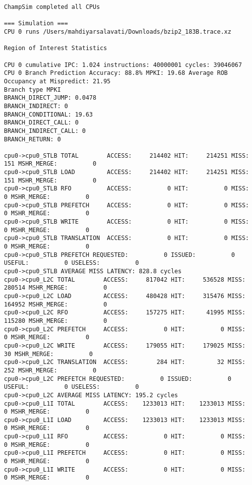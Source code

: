 \documentclass[17pt]{article}
\begin{document}
\begin{LTR}
\begin{lstlisting}[basicstyle=\tiny\ttfamily]
ChampSim completed all CPUs

=== Simulation ===
CPU 0 runs /Users/mahdiyarsalavati/Downloads/bzip2_183B.trace.xz

Region of Interest Statistics

CPU 0 cumulative IPC: 1.024 instructions: 40000001 cycles: 39046067
CPU 0 Branch Prediction Accuracy: 88.8% MPKI: 19.68 Average ROB Occupancy at Mispredict: 21.95
Branch type MPKI
BRANCH_DIRECT_JUMP: 0.0478
BRANCH_INDIRECT: 0
BRANCH_CONDITIONAL: 19.63
BRANCH_DIRECT_CALL: 0
BRANCH_INDIRECT_CALL: 0
BRANCH_RETURN: 0

cpu0->cpu0_STLB TOTAL        ACCESS:     214402 HIT:     214251 MISS:        151 MSHR_MERGE:          0
cpu0->cpu0_STLB LOAD         ACCESS:     214402 HIT:     214251 MISS:        151 MSHR_MERGE:          0
cpu0->cpu0_STLB RFO          ACCESS:          0 HIT:          0 MISS:          0 MSHR_MERGE:          0
cpu0->cpu0_STLB PREFETCH     ACCESS:          0 HIT:          0 MISS:          0 MSHR_MERGE:          0
cpu0->cpu0_STLB WRITE        ACCESS:          0 HIT:          0 MISS:          0 MSHR_MERGE:          0
cpu0->cpu0_STLB TRANSLATION  ACCESS:          0 HIT:          0 MISS:          0 MSHR_MERGE:          0
cpu0->cpu0_STLB PREFETCH REQUESTED:          0 ISSUED:          0 USEFUL:          0 USELESS:          0
cpu0->cpu0_STLB AVERAGE MISS LATENCY: 828.8 cycles
cpu0->cpu0_L2C TOTAL        ACCESS:     817042 HIT:     536528 MISS:     280514 MSHR_MERGE:          0
cpu0->cpu0_L2C LOAD         ACCESS:     480428 HIT:     315476 MISS:     164952 MSHR_MERGE:          0
cpu0->cpu0_L2C RFO          ACCESS:     157275 HIT:      41995 MISS:     115280 MSHR_MERGE:          0
cpu0->cpu0_L2C PREFETCH     ACCESS:          0 HIT:          0 MISS:          0 MSHR_MERGE:          0
cpu0->cpu0_L2C WRITE        ACCESS:     179055 HIT:     179025 MISS:         30 MSHR_MERGE:          0
cpu0->cpu0_L2C TRANSLATION  ACCESS:        284 HIT:         32 MISS:        252 MSHR_MERGE:          0
cpu0->cpu0_L2C PREFETCH REQUESTED:          0 ISSUED:          0 USEFUL:          0 USELESS:          0
cpu0->cpu0_L2C AVERAGE MISS LATENCY: 195.2 cycles
cpu0->cpu0_L1I TOTAL        ACCESS:    1233013 HIT:    1233013 MISS:          0 MSHR_MERGE:          0
cpu0->cpu0_L1I LOAD         ACCESS:    1233013 HIT:    1233013 MISS:          0 MSHR_MERGE:          0
cpu0->cpu0_L1I RFO          ACCESS:          0 HIT:          0 MISS:          0 MSHR_MERGE:          0
cpu0->cpu0_L1I PREFETCH     ACCESS:          0 HIT:          0 MISS:          0 MSHR_MERGE:          0
cpu0->cpu0_L1I WRITE        ACCESS:          0 HIT:          0 MISS:          0 MSHR_MERGE:          0

\end{lstlisting}
\end{LTR}
\end{document}
